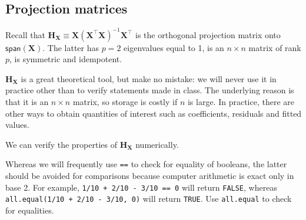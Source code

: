 \documentclass[]{book}
\newenvironment{Shaded}{\begin{snugshade}}{\end{snugshade}}
\newcommand{\CommentTok}[1]{\textcolor[rgb]{0.56,0.35,0.01}{\textit{#1}}}
\newcommand{\DecValTok}[1]{\textcolor[rgb]{0.00,0.00,0.81}{#1}}
\newcommand{\KeywordTok}[1]{\textcolor[rgb]{0.13,0.29,0.53}{\textbf{#1}}}
\newcommand{\NormalTok}[1]{#1}
\newcommand{\OperatorTok}[1]{\textcolor[rgb]{0.81,0.36,0.00}{\textbf{#1}}}
\newcommand{\StringTok}[1]{\textcolor[rgb]{0.31,0.60,0.02}{#1}}
\theoremstyle{definition}
\theoremstyle{definition}
\theoremstyle{definition}
\theoremstyle{remark}
\let\BeginKnitrBlock\begin \let\EndKnitrBlock\end
\begin{document}
\begin{Shaded}
\end{Shaded}

\hypertarget{projection-matrices}{%
\subsection{Projection matrices}\label{projection-matrices}}

Recall that \(\mathbf{H}_{\mathbf{X}} \equiv \mathbf{X}(\mathbf{X}^\top\mathbf{X})^{-1}\mathbf{X}^\top\) is the orthogonal projection matrix onto
\(\mathsf{span}(\mathbf{X})\). The latter has \(p=2\) eigenvalues equal to 1, is an \(n \times n\) matrix of rank \(p\), is symmetric and idempotent.

\BeginKnitrBlock{rmdnote}
\(\mathbf{H}_{\mathbf{X}}\) is a great theoretical tool, but make no mistake: we will never use it in practice other than to verify statements made in class. The underlying reason is that it is an \(n \times n\) matrix, so storage is costly if \(n\) is large. In practice, there are other ways to obtain quantities of interest such as coefficients, residuals and fitted values.
\EndKnitrBlock{rmdnote}

We can verify the properties of \(\mathbf{H}_{\mathbf{X}}\) numerically.

\BeginKnitrBlock{rmdcaution}
Whereas we will frequently use \texttt{==} to check for equality of booleans, the latter should be avoided for comparisons because computer arithmetic is exact only in base 2. For example, \texttt{1/10\ +\ 2/10\ -\ 3/10\ ==\ 0} will return \texttt{FALSE}, whereas \texttt{all.equal(1/10\ +\ 2/10\ -\ 3/10,\ 0)} will return \texttt{TRUE}.
Use \texttt{all.equal} to check for equalities.
\EndKnitrBlock{rmdcaution}

\begin{Shaded}
\end{Shaded}
\end{document}

